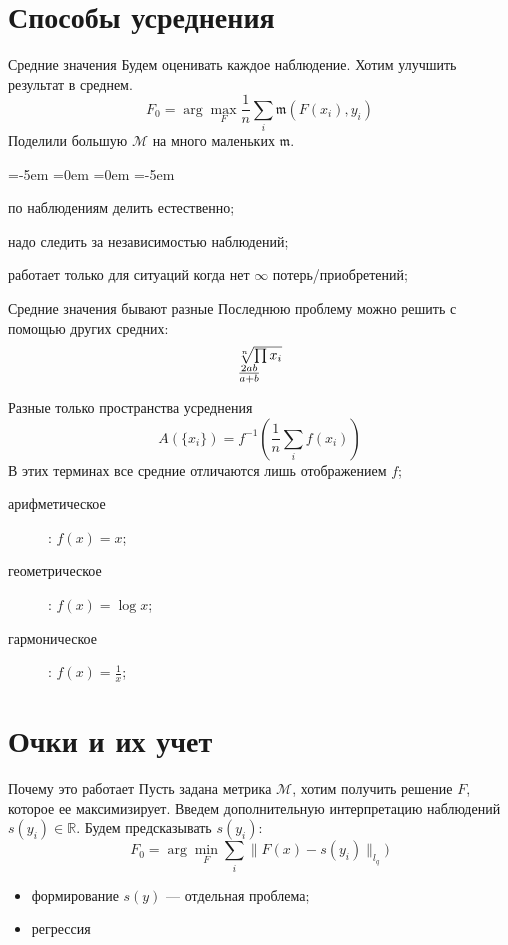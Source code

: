 \documentclass[14pt, fleqn, xcolor={dvipsnames, table}]{beamer}
\begin{document}
\section{Способы усреднения}

\begin{frame}{Средние значения}
Будем оценивать каждое наблюдение. Хотим улучшить результат в среднем.
$$
F_0 = \arg \max_F \frac{1}{n} \sum_i \mathfrak{m}(F(x_i),y_i)
$$
Поделили большую $\mathcal{M}$ на много маленьких $\mathfrak{m}$. 
\begin{description}
\small
\leftmargin=-5em
\itemindent=0em
=0em
\leftskip=-5em
  \item[\color{green}+] по наблюдениям делить естественно;
  \item[\color{red}---] надо следить за независимостью наблюдений;
  \item[\color{red}---] работает только для ситуаций когда нет $\infty$ потерь/приобретений;
\end{description} 
\end{frame}

\begin{frame}{Средние значения бывают разные}
Последнюю проблему можно решить с помощью других средних:
$$\begin{array}{l}
\sqrt[n]{\prod x_i} \\
2ab \over a+b \\
\end{array}$$
\end{frame}

\begin{frame}{Разные только пространства усреднения}
$$
A(\{x_i\}) = f^{-1}\left(\frac{1}{n} \sum_i f(x_i)\right)
$$
В этих терминах все средние отличаются лишь отображением $f$;
\begin{description}
  \item[арифметическое]: $f(x) = x$; 
  \item[геометрическое]: $f(x) = \log x$; 
  \item[гармоническое]: $f(x) = \frac{1}{x}$; 
\end{description}
\end{frame}

\section{Очки и их учет}

\begin{frame}{Почему это работает}
Пусть задана метрика $\mathcal{M}$, хотим получить решение $F$, которое ее максимизирует. Введем дополнительную интерпретацию наблюдений $s(y_i) \in \mathbb{R}$. Будем предсказывать $s(y_i)$:
$$
F_0 = \arg\min_F \sum_i \|F(x) - s(y_i)\|_{l_q})
$$
\begin{itemize}
  \item формирование $s(y)$ --- отдельная проблема;
  \item регрессия 
\end{itemize}
\end{frame}
\end{document}
